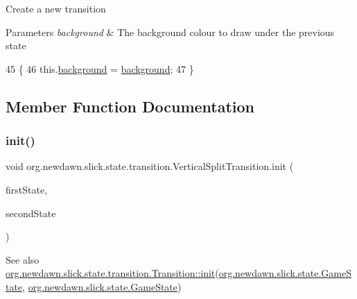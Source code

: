 Create a new transition


\begin{DoxyParams}{Parameters}
{\em background} & The background colour to draw under the previous state \\
\hline
\end{DoxyParams}

\begin{DoxyCode}
45                                                      \{
46         this.\mbox{\hyperlink{classorg_1_1newdawn_1_1slick_1_1state_1_1transition_1_1_vertical_split_transition_ab060d40f8fccd5b704cdfe466e1df6ea}{background}} = \mbox{\hyperlink{classorg_1_1newdawn_1_1slick_1_1state_1_1transition_1_1_vertical_split_transition_ab060d40f8fccd5b704cdfe466e1df6ea}{background}};
47     \}
\end{DoxyCode}


\subsection{Member Function Documentation}
\mbox{\label{classorg_1_1newdawn_1_1slick_1_1state_1_1transition_1_1_vertical_split_transition_a1722b29907ee226e0632b6694fe887a7}} 
\subsubsection{\texorpdfstring{init()}{init()}}
{\footnotesize\ttfamily void org.\+newdawn.\+slick.\+state.\+transition.\+Vertical\+Split\+Transition.\+init (\begin{DoxyParamCaption}\item[{\mbox{\hyperlink{interfaceorg_1_1newdawn_1_1slick_1_1state_1_1_game_state}{Game\+State}}}]{first\+State,  }\item[{\mbox{\hyperlink{interfaceorg_1_1newdawn_1_1slick_1_1state_1_1_game_state}{Game\+State}}}]{second\+State }\end{DoxyParamCaption})\hspace{0.3cm}{\ttfamily [inline]}}

\begin{DoxySeeAlso}{See also}
\mbox{\hyperlink{interfaceorg_1_1newdawn_1_1slick_1_1state_1_1transition_1_1_transition_a7b59f0c9205f1f0417ee18bc526e5b01}{org.\+newdawn.\+slick.\+state.\+transition.\+Transition\+::init}}(\mbox{\hyperlink{interfaceorg_1_1newdawn_1_1slick_1_1state_1_1_game_state}{org.\+newdawn.\+slick.\+state.\+Game\+State}}, \mbox{\hyperlink{interfaceorg_1_1newdawn_1_1slick_1_1state_1_1_game_state}{org.\+newdawn.\+slick.\+state.\+Game\+State}}) 
\end{DoxySeeAlso}


